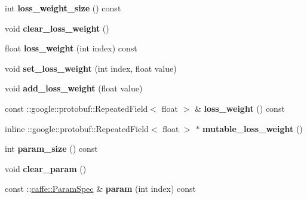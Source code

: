 \begin{DoxyCompactItemize}
int {\bfseries loss\+\_\+weight\+\_\+size} () const
\item 
\mbox{\label{classcaffe_1_1_layer_parameter_a694540cc07ef35b23a53c891b9df820f}} 
void {\bfseries clear\+\_\+loss\+\_\+weight} ()
\item 
\mbox{\label{classcaffe_1_1_layer_parameter_a8865cfdf9440e101edb42c477d3b3718}} 
float {\bfseries loss\+\_\+weight} (int index) const
\item 
\mbox{\label{classcaffe_1_1_layer_parameter_a7ce18911fa078a8237c9e0864031048b}} 
void {\bfseries set\+\_\+loss\+\_\+weight} (int index, float value)
\item 
\mbox{\label{classcaffe_1_1_layer_parameter_a0736120da0905132e3663b93c0d1a0bd}} 
void {\bfseries add\+\_\+loss\+\_\+weight} (float value)
\item 
\mbox{\label{classcaffe_1_1_layer_parameter_a9acbca9354c780c7ffe748c47e59bc6b}} 
const \+::google\+::protobuf\+::\+Repeated\+Field$<$ float $>$ \& {\bfseries loss\+\_\+weight} () const
\item 
\mbox{\label{classcaffe_1_1_layer_parameter_ac8cd8a6be3d25549a9ada13641c0be90}} 
inline \+::google\+::protobuf\+::\+Repeated\+Field$<$ float $>$ $\ast$ {\bfseries mutable\+\_\+loss\+\_\+weight} ()
\item 
\mbox{\label{classcaffe_1_1_layer_parameter_af313379bfa6468aa9c646f7c3e60e886}} 
int {\bfseries param\+\_\+size} () const
\item 
\mbox{\label{classcaffe_1_1_layer_parameter_afec13548d0f227a453b96ff97aee0254}} 
void {\bfseries clear\+\_\+param} ()
\item 
\mbox{\label{classcaffe_1_1_layer_parameter_a8475eb40149b5a5583e7b7babb71044e}} 
const \+::\mbox{\hyperlink{classcaffe_1_1_param_spec}{caffe\+::\+Param\+Spec}} \& {\bfseries param} (int index) const
\item 
\mbox{\label{classcaffe_1_1_layer_parameter_a978fc8403561219078537db267481bcf}} 

\end{DoxyCompactItemize}
